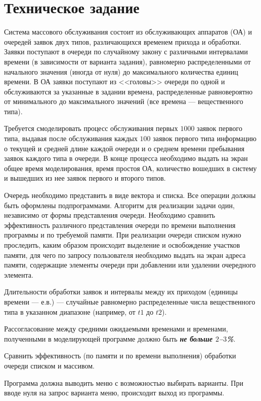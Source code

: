 \documentclass[a4paper,12pt]{extarticle}
\begin{document}
\section{Техническое задание}
Система массового обслуживания состоит из обслуживающих аппаратов (ОА) и очередей заявок двух типов, различающихся временем прихода и обработки. Заявки поступают в очереди по случайному закону с различными интервалами времени (в зависимости от варианта задания), равномерно распределенными от начального значения (иногда от нуля) до максимального количества единиц времени. В ОА заявки поступают из <<головы>> очереди по одной и обслуживаются за указанные в задании времена, распределенные равновероятно от минимального до максимального значений (все времена --- вещественного типа).

Требуется смоделировать процесс обслуживания первых $1000$ заявок первого типа, выдавая после обслуживания каждых $100$ заявок первого типа информацию о текущей и средней длине каждой очереди и о среднем времени пребывания заявок каждого типа в очереди. В конце процесса необходимо выдать на экран общее время моделирования, время простоя ОА, количество вошедших в систему и вышедших из нее заявок первого и второго типов.

Очередь необходимо представить в виде вектора и списка. Все операции должны быть оформлены подпрограммами. Алгоритм для реализации задачи один, независимо от формы представления очереди. Необходимо сравнить эффективность различного представления очереди по времени выполнения программы и по требуемой памяти. При реализации очереди списком нужно проследить, каким образом происходит выделение и освобождение участков памяти, для чего по запросу пользователя необходимо выдать на экран адреса памяти, содержащие элементы очереди при добавлении или удалении очередного элемента.

Длительности обработки заявок и интервалы между их приходом (единицы времени --- е.в.) --- случайные равномерно распределенные числа вещественного типа в указанном диапазоне (например, от $t1$ до $t2$).

Рассогласование между средними ожидаемыми временами и временами, полученными в моделирующей программе должно быть \textit{\textbf{не больше $2$–$3$\%}}.

Сравнить эффективность (по памяти и по времени выполнения) обработки очереди списком и массивом.

Программа должна выводить меню с возможностью выбирать варианты. При вводе нуля на запрос варианта меню, происходит выход из программы.
\end{document}
